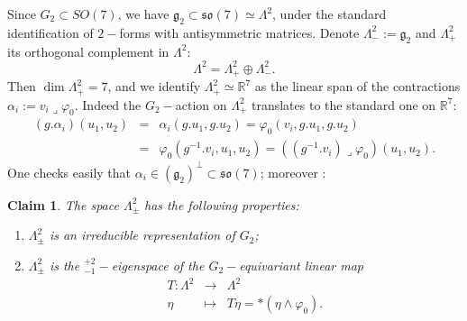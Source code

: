 \documentclass{article}
\newtheorem{claim}[theorem]{Claim}
\begin{document}
Since $G_{2}\subset SO\left( 7\right)$, we have $\mathfrak{g}%
_{2}\subset \mathfrak{so}\left( 7\right) \simeq \Lambda ^{2}$, under the
standard identification of $2-$forms with antisymmetric matrices. Denote $\Lambda _{-}^{2}:= \mathfrak{g}_{2}$
and $\Lambda _{+}^{2}$ its orthogonal complement in $\Lambda ^{2}$:%
\begin{equation}
\Lambda ^{2}=\Lambda _{+}^{2}\oplus \Lambda _{-}^{2}.  \label{split}
\end{equation}%
Then $\dim \Lambda _{+}^{2}=7$, and we identify $\Lambda _{+}^{2}\simeq \mathbb{R}^{7}$ as the linear span
of the contractions $\alpha _{i}:= v_{i}\lrcorner \varphi _{0}$. Indeed
the  $G_{2}-$action on $\Lambda _{+}^{2}$ translates to the
standard one on $\mathbb{R}^{7}$:%
\begin{eqnarray*}
\left( g.\alpha _{i}\right) (u_{1},u_{2}) &=&\alpha _{i}\left(
g.u_{1},g.u_{2}\right) =\varphi _{0}\left( v_{i},g.u_{1},g.u_{2}\right) \\
&=&\varphi _{0}\left( g^{-1}.v_{i},u_{1},u_{2}\right) =\left( \left(
g^{-1}.v_{i}\right) \lrcorner \varphi _{0}\right) \left( u_{1},u_{2}\right) .
\end{eqnarray*}%
One checks easily that $\alpha _{i}\in \left( \mathfrak{g}%
_{2}\right) ^{\perp }\subset \mathfrak{so}\left( 7\right) $;  moreover \cite[p. 541]{Bryant}:
\begin{claim}
\label{+2 -1 eigenspaces}The space $\Lambda _{\pm }^{2}$ has the following
properties:

\begin{enumerate}
\item $\Lambda _{\pm }^{2}$ is an irreducible representation of $G_{2}$;

\item $\Lambda _{\pm }^{2}$ is the $_{-1}^{+2}-$eigenspace of the  $%
G_{2}-$equivariant linear map%
        \begin{eqnarray*}
        T : \Lambda ^{2} &\rightarrow& \Lambda ^{2} \\
        \eta &\mapsto &T\eta =\ast \left( \eta \wedge \varphi _{0}\right) .
\end{eqnarray*}
\end{enumerate}
\end{claim}
\end{document}
